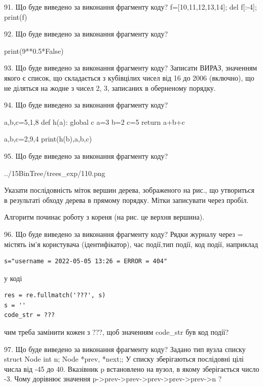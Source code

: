 \documentclass[11pt]{article}
\begin{document}

91. Що буде виведено за виконання фрагменту коду?
f=[10,11,12,13,14]; del f[:-4]; print(f)

92. Що буде виведено за виконання фрагменту коду?

print(9**0.5*False)


93. Що буде виведено за виконання фрагменту коду?
Записати ВИРАЗ, значенням якого є список, що складається з кубівцілих чисел від 16 до 2006 (включно), що не діляться на жодне з чисел 2, 3, записаних в оберненому порядку.

94. Що буде виведено за виконання фрагменту коду?

a,b,c=5,1,8
def h(a):
global c    a=3
    b=2
    c=5
    return a+b+c

a,b,c=2,9,4
print(h(b),a,b,c)


95. Що буде виведено за виконання фрагменту коду?

\begin{center}
	{../15BinTree/trees_exp/110.png}
\end{center}
Указати послідовність міток вершин дерева, зображеного на рис., що утвориться в результаті обходу дерева в прямому порядку. Мітки записувати через пробіл.\par Алгоритм починає роботу з кореня (на рис. це верхня вершина).


96. Що буде виведено за виконання фрагменту коду?
Рядки журналу через = містять ім'я користувача (ідентифікатор), час події,тип події, код події, наприклад
\begin{verbatim}
s="username = 2022-05-05 13:26 = ERROR = 404"
\end{verbatim}
у коді 
\begin{verbatim}
res = re.fullmatch('???', s) 
s = ''
code_str = ??? 
\end{verbatim}
чим треба замінити кожен з ???, щоб значенням code\_str був код події? 




97. Що буде виведено за виконання фрагменту коду?
Задано тип вузла списку struct Node {int n; Node *prev, *next;};
У списку зберігаються послідовні цілі числа від -45 до 40. Вказівник p встановлено на вузол, в якому зберігається число -3.
Чому дорівнює значення p->prev->prev->prev->prev->prev->n ?
\end{document}
